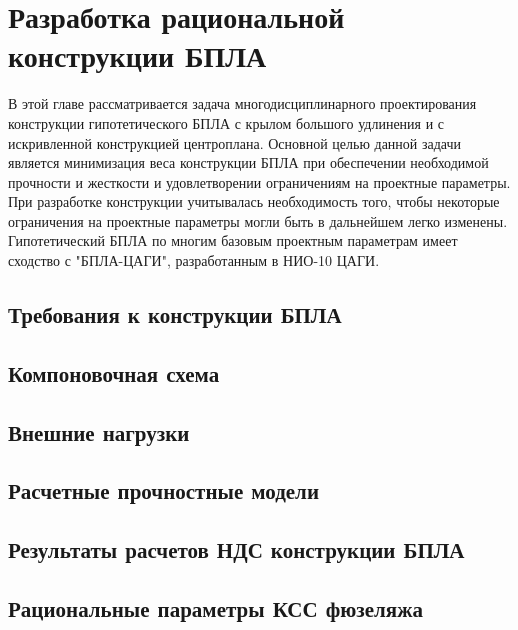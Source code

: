 \chapter{Разработка рациональной конструкции БПЛА}

В этой главе рассматривается задача многодисциплинарного проектирования конструкции гипотетического БПЛА с крылом большого удлинения и с искривленной конструкцией центроплана.  Основной целью данной задачи является минимизация веса конструкции БПЛА при обеспечении необходимой прочности и жесткости и удовлетворении ограничениям на проектные параметры. При разработке конструкции учитывалась необходимость того, чтобы некоторые ограничения на проектные параметры могли быть в дальнейшем легко изменены. Гипотетический БПЛА по многим базовым проектным параметрам имеет сходство с "БПЛА-ЦАГИ", разработанным в НИО-10 ЦАГИ.


\section{Требования к конструкции БПЛА}



\section{Компоновочная схема}
	

\section{Внешние нагрузки}
\label{sec:externalLoads}



\section{Расчетные прочностные модели}




\section{Результаты расчетов НДС конструкции БПЛА} 


\section{Рациональные параметры КСС фюзеляжа}
